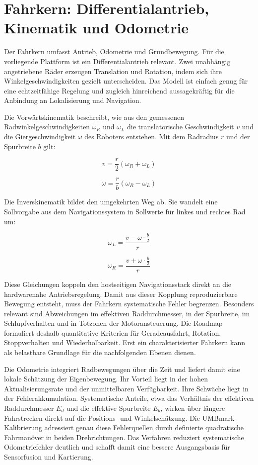 \section{Fahrkern: Differentialantrieb, Kinematik und Odometrie}

Der Fahrkern umfasst Antrieb, Odometrie und Grundbewegung. Für die vorliegende Plattform ist ein Differentialantrieb relevant. Zwei unabhängig angetriebene Räder erzeugen Translation und Rotation, indem sich ihre Winkelgeschwindigkeiten gezielt unterscheiden. Das Modell ist einfach genug für eine echtzeitfähige Regelung und zugleich hinreichend aussagekräftig für die Anbindung an Lokalisierung und Navigation.

Die Vorwärtskinematik beschreibt, wie aus den gemessenen Radwinkelgeschwindigkeiten $\omega_R$ und $\omega_L$ die translatorische Geschwindigkeit $v$ und die Giergeschwindigkeit $\omega$ des Roboters entstehen. Mit dem Radradius $r$ und der Spurbreite $b$ gilt:

$$v = \frac{r}{2} \left(\omega_R + \omega_L\right)$$

$$\omega = \frac{r}{b} \left(\omega_R - \omega_L\right)$$

Die Inverskinematik bildet den umgekehrten Weg ab. Sie wandelt eine Sollvorgabe aus dem Navigationssystem in Sollwerte für linkes und rechtes Rad um:

$$\omega_L = \frac{v - \omega \cdot \frac{b}{2}}{r}$$

$$\omega_R = \frac{v + \omega \cdot \frac{b}{2}}{r}$$

Diese Gleichungen koppeln den hostseitigen Navigationsstack direkt an die hardwarenahe Antriebsregelung. Damit aus dieser Kopplung reproduzierbare Bewegung entsteht, muss der Fahrkern systematische Fehler begrenzen. Besonders relevant sind Abweichungen im effektiven Raddurchmesser, in der Spurbreite, im Schlupfverhalten und in Totzonen der Motoransteuerung. Die Roadmap formuliert deshalb quantitative Kriterien für Geradeausfahrt, Rotation, Stoppverhalten und Wiederholbarkeit. Erst ein charakterisierter Fahrkern kann als belastbare Grundlage für die nachfolgenden Ebenen dienen.

Die Odometrie integriert Radbewegungen über die Zeit und liefert damit eine lokale Schätzung der Eigenbewegung. Ihr Vorteil liegt in der hohen Aktualisierungsrate und der unmittelbaren Verfügbarkeit. Ihre Schwäche liegt in der Fehlerakkumulation. Systematische Anteile, etwa das Verhältnis der effektiven Raddurchmesser $E_d$ und die effektive Spurbreite $E_b$, wirken über längere Fahrstrecken direkt auf die Positions- und Winkelschätzung. Die UMBmark-Kalibrierung adressiert genau diese Fehlerquellen durch definierte quadratische Fahrmanöver in beiden Drehrichtungen. Das Verfahren reduziert systematische Odometriefehler deutlich und schafft damit eine bessere Ausgangsbasis für Sensorfusion und Kartierung.

